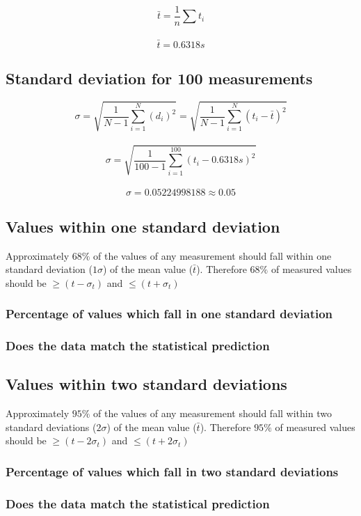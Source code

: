 \documentclass[11pt, letterpaper, includehead]{article}
\begin{document}
  $$\bar{t} = \frac{1}{n}\sum t_i$$\\
  $$\bar{t} = 0.6318s$$

\subsection{Standard deviation for 100 measurements} %


  $$\sigma = \sqrt{\frac{1}{N - 1}\sum_{i = 1}^{N} (d_i)^2} = \sqrt{\frac{1}{N - 1}\sum_{i = 1}^{N} (t_i - \bar{t})^2}$$\\
  $$\sigma = \sqrt{\frac{1}{100 - 1}\sum_{i = 1}^{100}(t_i - 0.6318s)^2}$$\\
  $$\sigma = 0.05224998188 \approx 0.05$$


\subsection{Values within one standard deviation} %
Approximately $68\%$ of the values of any measurement should fall within one
standard deviation ($1 \sigma$) of the mean value ($\bar{t}$). Therefore $68\%$ of measured
values should be $\geq (t - \sigma_t)$ and $\leq (t + \sigma_t)$

\subsubsection{Percentage of values which fall in one standard deviation}

\subsubsection{Does the data match the statistical prediction}

\subsection{Values within two standard deviations} %
Approximately $95\%$ of the values of any measurement should fall within two
standard deviations ($2 \sigma$) of the mean value ($\bar{t}$). Therefore $95\%$ of measured
values should be $\geq (t - 2 \sigma_t)$ and $\leq (t + 2 \sigma_t)$

\subsubsection{Percentage of values which fall in two standard deviations}

\subsubsection{Does the data match the statistical prediction}
\end{document}
